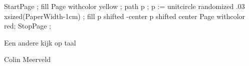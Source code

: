 

   StartPage ;
     fill Page withcolor yellow ;
      path p ; p := unitcircle randomized .03 xsized(PaperWidth-1cm) ;
     fill p shifted -center p shifted center Page  withcolor red;
   StopPage ;
\stopuseMPgraphic

\setupbackgrounds[page][background=cover]

\startstandardmakeup
  \raggedcenter
  \vfill {}\setstrut \strut Een andere kijk op taal 
  \blank[2*big] \setstrut \strut Colin Meerveld
  \vfill
\stopstandardmakeup


\setupbackgrounds[page][background=]


